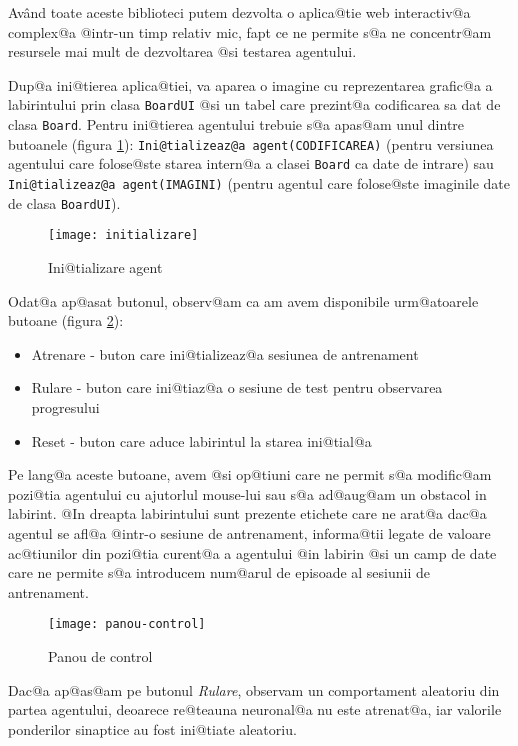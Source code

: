 Av\^and toate aceste biblioteci putem dezvolta o aplica@tie web interactiv@a complex@a @intr-un timp relativ mic, fapt ce ne permite s@a ne concentr@am resursele mai mult de dezvoltarea @si testarea agentului.

Dup@a ini@tierea aplica@tiei, va aparea o imagine cu reprezentarea grafic@a a labirintului prin clasa \texttt{BoardUI} @si un tabel care prezint@a codificarea sa dat de clasa \texttt{Board}. Pentru ini@tierea agentului trebuie s@a apas@am unul dintre butoanele (figura \ref{fig:initializare}): \texttt{Ini@tializeaz@a agent(CODIFICAREA)} (pentru versiunea agentului care folose@ste starea intern@a a clasei \texttt{Board} ca date de intrare) sau \texttt{Ini@tializeaz@a agent(IMAGINI)} (pentru agentul care folose@ste imaginile date de clasa \texttt{BoardUI}).

\begin{figure}[h]
	\centering
	\texttt{[image: initializare]}
	\caption{Ini@tializare agent}
	\label{fig:initializare}
\end{figure}


Odat@a ap@asat butonul, observ@am ca am avem disponibile urm@atoarele butoane (figura \ref{fig:panou-control}):
\begin{itemize}
	\item Atrenare - buton care ini@tializeaz@a sesiunea de antrenament
	\item Rulare - buton care ini@tiaz@a o sesiune de test pentru observarea progresului
	\item Reset - buton care aduce labirintul la starea ini@tial@a
\end{itemize}

Pe lang@a aceste butoane, avem @si op@tiuni care ne permit s@a modific@am pozi@tia agentului cu ajutorlul mouse-lui sau s@a ad@aug@am un obstacol in labirint. @In dreapta labirintului sunt prezente etichete care ne arat@a dac@a agentul se afl@a @intr-o sesiune de antrenament, informa@tii legate de valoare ac@tiunilor din pozi@tia curent@a a agentului @in labirin @si un camp de date care ne permite s@a introducem num@arul de episoade al sesiunii de antrenament.

\begin{figure}[h]
	\centering
	\texttt{[image: panou-control]}
	\caption{Panou de control}
	\label{fig:panou-control}
\end{figure}

Dac@a ap@as@am pe butonul \textsl{Rulare}, observam un comportament aleatoriu din partea agentului, deoarece re@teauna neuronal@a nu este atrenat@a, iar valorile ponderilor sinaptice au fost ini@tiate aleatoriu.

